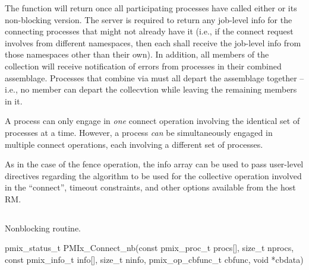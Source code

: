 The function will return once all participating processes have called either  or its non-blocking version.
The server is required to return any job-level info for the connecting processes that might not already have it (i.e., if the connect request involves  from different namespaces, then each  shall receive the job-level info from those namespaces other than their own). In addition, all members of the collection will receive notification of errors from processes in their combined assemblage. Processes that combine via  must all depart the assemblage together – i.e., no member can depart the collecvtion while leaving the remaining members in it.

A process can only engage in \emph{one} connect operation involving the identical set of processes at a time.
However, a process \emph{can} be simultaneously engaged in multiple connect operations, each involving a different set of processes.

As in the case of the fence operation, the info array can be used to pass user-level directives regarding the algorithm to be used for the collective operation involved in the ``connect'', timeout constraints, and other options available from the host RM.


\subsection{}

\summary

Nonblocking  routine.

\format

\cspecificstart
\begin{codepar}
pmix_status_t
PMIx_Connect_nb(const pmix_proc_t procs[], size_t nprocs,
                const pmix_info_t info[], size_t ninfo,
                pmix_op_cbfunc_t cbfunc, void *cbdata)
\end{codepar}
\cspecificend

\begin{arglist}
\end{arglist}


